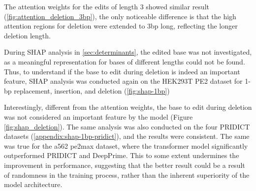 The attention weights for the edits of length 3 showed similar result (\autoref{fig:attention_deletion_3bp}), the only noticeable difference is that the high attention regions for deletion were extended to 3bp long, reflecting the longer deletion length.

During SHAP analysis in \autoref{sec:determinants}, the edited base was not investigated, as a meaningful representation for bases of different lengths could not be found. Thus, to understand if the base to edit during deletion is indeed an important feature, SHAP analysis was conducted again on the HEK293T PE2 dataset for 1-bp replacement, insertion, and deletion (\autoref{fig:shap-1bp})


Interestingly, different from the attention weights, the base to edit during deletion was not considered an important feature by the model (Figure \ref{fig:shap_deletion}). The same analysis was also conducted on the four PRIDICT datasets (\autoref{appendix:shap-1bp-pridict}), and the results were consistent. 
The same was true for the a562 pe2max dataset, where the transformer model significantly outperformed PRIDICT and DeepPrime. This to some extent undermines the improvement in performance, suggesting that the better result could be a result of randomness in the training process, rather than the inherent superiority of the model architecture.